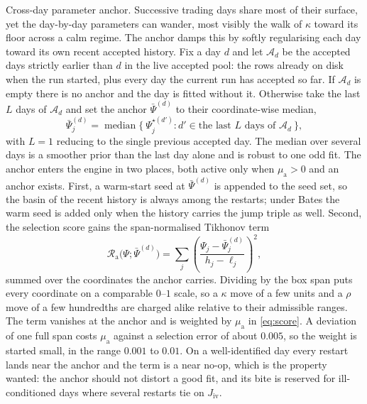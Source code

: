 \documentclass[a4paper, 11pt, reqno]{amsart}
\makeatletter
\def\paragraph{\@startsection{paragraph}{4}%
	\z@\z@{-\fontdimen2\font}%
	{\normalfont\bfseries}}
\DeclareMathOperator{\med}{median}
\newcommand{\ConstAnchorWeightSym}{\mu_{\mathrm{a}}}     \newcommand{\ConstAnchorWeightVal}{0.005}
\newcommand{\ConstAnchorLookbackSym}{L}                  \newcommand{\ConstAnchorLookbackVal}{5}
\makeatother
\begin{document}
		\paragraph{Cross-day parameter anchor.} Successive trading days share most of their surface, yet the
		day-by-day parameters can wander, most visibly the walk of $\kappa$ toward its floor across a calm
		regime. The anchor damps this by softly regularising each day toward its own recent accepted
		history. Fix a day $d$ and let $\mathcal{A}_d$ be the accepted days strictly earlier than $d$ in
		the live accepted pool: the rows already on disk when the run started, plus every day the current
		run has accepted so far. If $\mathcal{A}_d$ is empty there is no anchor and the day is fitted
		without it. Otherwise take the last $\ConstAnchorLookbackSym$ days of $\mathcal{A}_d$ and set the
		anchor $\bar\Psi^{(d)}$ to their coordinate-wise median,
		\begin{equation}\label{eq:anchor}
			\bar\Psi^{(d)}_j = \med\bigl\{\ \Psi^{\star(d')}_j : d' \in \text{the last } \ConstAnchorLookbackSym \text{ days of } \mathcal{A}_d\ \bigr\},
		\end{equation}
		with $\ConstAnchorLookbackSym=1$ reducing to the single previous accepted day. The median over
		several days is a smoother prior than the last day alone and is robust to one odd fit. The anchor
		enters the engine in two places, both active only when $\ConstAnchorWeightSym>0$ and an anchor
		exists. First, a warm-start seed at $\bar\Psi^{(d)}$ is appended to the seed set, so the basin of
		the recent history is always among the restarts; under Bates the warm seed is added only when the
		history carries the jump triple as well. Second, the selection score gains the span-normalised
		Tikhonov term
		\begin{equation}\label{eq:anchor-dist}
			\mathcal{R}_{\mathrm{a}}\bigl(\Psi;\bar\Psi^{(d)}\bigr)
			= \sum_{j} \left( \frac{\Psi_j - \bar\Psi^{(d)}_j}{h_j - \ell_j} \right)^{2},
		\end{equation}
		summed over the coordinates the anchor carries. Dividing by the box span puts every coordinate on
		a comparable $0$--$1$ scale, so a $\kappa$ move of a few units and a $\rho$ move of a few
		hundredths are charged alike relative to their admissible ranges. The term vanishes at the anchor
		and is weighted by $\ConstAnchorWeightSym$ in \eqref{eq:score}. A deviation of one full span costs
		$\ConstAnchorWeightSym$ against a selection error of about $0.005$, so the weight is started small,
		in the range $0.001$ to $0.01$. On a well-identified day every restart lands near the anchor and
		the term is a near no-op, which is the property wanted: the anchor should not distort a good fit,
		and its bite is reserved for ill-conditioned days where several restarts tie on
		$J_{\mathrm{iv}}$.
\end{document}
